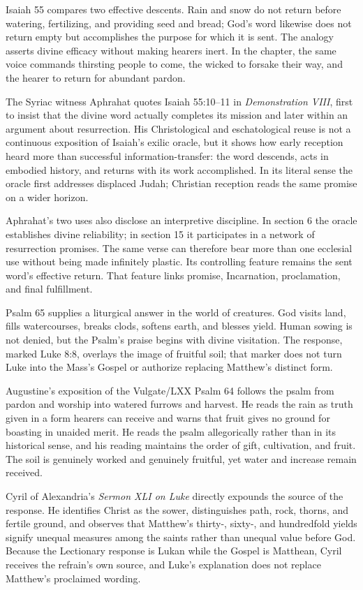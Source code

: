 Isaiah 55 compares two effective descents. Rain and snow do not return before watering, fertilizing, and providing seed and bread; God's word likewise does not return empty but accomplishes the purpose for which it is sent. The analogy asserts divine efficacy without making hearers inert. In the chapter, the same voice commands thirsting people to come, the wicked to forsake their way, and the hearer to return for abundant pardon.

The Syriac witness Aphrahat quotes Isaiah 55:10--11 in \emph{Demonstration VIII}, first to insist that the divine word actually completes its mission and later within an argument about resurrection. His Christological and eschatological reuse is not a continuous exposition of Isaiah's exilic oracle, but it shows how early reception heard more than successful information-transfer: the word descends, acts in embodied history, and returns with its work accomplished. In its literal sense the oracle first addresses displaced Judah; Christian reception reads the same promise on a wider horizon.

Aphrahat's two uses also disclose an interpretive discipline. In section 6 the oracle establishes divine reliability; in section 15 it participates in a network of resurrection promises. The same verse can therefore bear more than one ecclesial use without being made infinitely plastic. Its controlling feature remains the sent word's effective return. That feature links promise, Incarnation, proclamation, and final fulfillment.

Psalm 65 supplies a liturgical answer in the world of creatures. God visits land, fills watercourses, breaks clods, softens earth, and blesses yield. Human sowing is not denied, but the Psalm's praise begins with divine visitation. The response, marked Luke 8:8, overlays the image of fruitful soil; that marker does not turn Luke into the Mass's Gospel or authorize replacing Matthew's distinct form.

Augustine's exposition of the Vulgate/LXX Psalm 64 follows the psalm from pardon and worship into watered furrows and harvest. He reads the rain as truth given in a form hearers can receive and warns that fruit gives no ground for boasting in unaided merit. He reads the psalm allegorically rather than in its historical sense, and his reading maintains the order of gift, cultivation, and fruit. The soil is genuinely worked and genuinely fruitful, yet water and increase remain received.

Cyril of Alexandria's \emph{Sermon XLI on Luke} directly expounds the source of the response. He identifies Christ as the sower, distinguishes path, rock, thorns, and fertile ground, and observes that Matthew's thirty-, sixty-, and hundredfold yields signify unequal measures among the saints rather than unequal value before God. Because the Lectionary response is Lukan while the Gospel is Matthean, Cyril receives the refrain's own source, and Luke's explanation does not replace Matthew's proclaimed wording.


